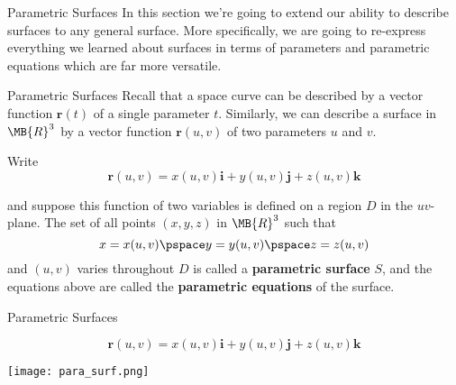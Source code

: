 \documentclass[11pt,english,
handout
]{beamer}
\begin{document}


\makebeamertitle












\begin{frame}{Parametric Surfaces}
In this section we're going to extend our ability to describe surfaces to any general surface. More specifically, we are going to re-express everything we learned about surfaces in terms of parameters and parametric equations which are far more versatile.
\end{frame}












\begin{frame}[t]{Parametric Surfaces}
\small
Recall that a space curve can be described by a vector function $\mathbf{r}(t)$ of a single parameter $t$. Similarly, we can describe a surface in $\MB{R}^3$ by a vector function $\mathbf{r}(u,v)$ of two parameters $u$ and $v$.\pause 

\lspace
\begin{definition}
Write
\[
\boxed{\mathbf{r}(u,v)=x(u,v)\mathbf{i}+y(u,v)\mathbf{j}+z(u,v)\mathbf{k}}
\]

\vspace{3mm}
and suppose this function of two variables is defined on a region $D$ in the $uv$-plane. The set of all points $(x,y,z)$ in $\MB{R}^3$ such that
\[
x=x(u,v)\pspace y=y(u,v)\pspace z=z(u,v)
\]
and $(u,v)$ varies throughout $D$ is called a \textbf{parametric surface} $S$, and the equations above are called the \textbf{parametric equations} of the surface.
\end{definition}
\end{frame}










\begin{frame}[t]{Parametric Surfaces}
\small

\[
\mathbf{r}(u,v)=x(u,v)\mathbf{i}+y(u,v)\mathbf{j}+z(u,v)\mathbf{k}
\]
\begin{center}
\texttt{[image: para\_surf.png]}
\end{center}
\end{frame}
\end{document}
